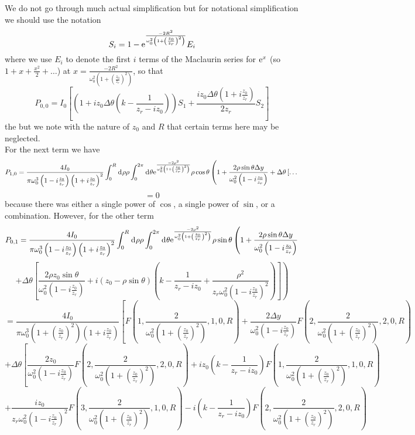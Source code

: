 \documentclass[11pt]{amsart}
\makeatletter
\newcommand{\e}{{\rm e}}				%
\newcommand{\msp}[1]{\mspace{#1mu}}		%
\newcommand{\0}{\varnothing}		%
\newcommand{\dd}{\msp{1} {\rm{d}} \msp{1}}	%
\newcommand{\1}{!}
\newcommand{\2}{@}
\newcommand{\3}{\#}
\newcommand{\4}{\$}
\newcommand{\5}{\%}
\newcommand{\6}{$^\wedge$}
\newcommand{\7}{\&}
\newcommand{\8}{*}
\newcommand{\9}{(}
\makeatother
\begin{document}
We do not go through much actual simplification but for notational simplification we should use  the notation
\[
S_i = 1- \e^{\frac{-2R^2}{\omega_0^2\left(1+\left(\frac{z_0}{z_r}\right)^2\right)}}E_i
\]
where we use $E_i$ to denote the first $i$ terms of the Maclaurin series for $\e^x$ (so $1+x+\frac{x^2}{2} + \ldots$) at $x = \frac{-2R^2}{\omega_0^2\left(1+\left(\frac{z_0}{z_r}\right)^2\right)}$, so that
\[
P_{0,0} = I_0\left[\left(1+iz_0\Delta \theta\left(k-\frac{1}{z_r-iz_0}\right)\right)S_1 + \frac{iz_0\Delta \theta\left(1+i\frac{z_0}{z_r}\right)}{2z_r}S_2\right]
\]
the but we note with the nature of $z_0$ and $R$ that certain terms here may be neglected.
\\
For the next term we have
\[
P_{1,0} = \frac{4I_0}{\pi\omega_0^3\left(1-i\frac{z_0}{z_r}\right)\left(1+i\frac{z_0}{z_r}\right)^2}\int_0^R\dd \rho \rho \int_0^{2\pi}\dd \theta \e^{\frac{-2\rho^2}{\omega_0^2\left(1+\left(\frac{z_0}{z_r}\right)^2\right)}}\rho\cos\theta\left(1+\frac{2\rho\sin\theta \Delta y}{\omega_0^2\left(1-i\frac{z_0}{z_r}\right)} + \Delta \theta\left[\ldots\right.\right.
\]
\[
=0
\]
because there was either a single power of $\cos$, a single power of $\sin$, or a combination. However, for the other term
\[
P_{0,1} =  \frac{4I_0}{\pi\omega_0^3\left(1-i\frac{z_0}{z_r}\right)\left(1+i\frac{z_0}{z_r}\right)^2}\int_0^R\dd \rho \rho \int_0^{2\pi}\dd \theta \e^{\frac{-2\rho^2}{\omega_0^2\left(1+\left(\frac{z_0}{z_r}\right)^2\right)}}\rho\sin\theta\left(1+\frac{2\rho\sin\theta \Delta y}{\omega_0^2\left(1-i\frac{z_0}{z_r}\right)} \right.\]
\[
\left.+ \Delta \theta\left[\frac{2\rho z_0 \sin \theta}{\omega_0^2\left(1-i\frac{z_0}{z_r}\right)}+i\left(z_0-\rho\sin\theta\right)\left(k-\frac{1}{z_r-iz_0}+\frac{\rho^2}{z_r\omega_0^2\left(1-i\frac{z_0}{z_r}\right)^2}\right)\right]\right)
\]
\[
=\frac{4I_0}{\pi\omega_0^3\left(1+\left(\frac{z_0}{z_r}\right)^2\right)\left(1+i\frac{z_0}{z_r}\right)}\left[F(1, \frac{2}{\omega_0^2\left(1+\left(\frac{z_0}{z_r}\right)^2\right)},1,0,R) + \frac{2\Delta y}{\omega_0^2\left(1-i\frac{z_0}{z_r}\right)}F\left(2,\frac{2}{\omega_0^2\left(1+\left(\frac{z_0}{z_r}\right)^2\right)},2,0,R\right)\right.
\]
\[\left. + \Delta \theta \left[\frac{2z_0}{\omega_0^2\left(1-i\frac{z_0}{z_r}\right)}F\left(2,\frac{2}{\omega_0^2\left(1+\left(\frac{z_0}{z_r}\right)^2\right)},2,0,R\right)+iz_0\left(k-\frac{1}{z_r-iz_0}\right)F\left(1,\frac{2}{\omega_0^2\left(1+\left(\frac{z_0}{z_r}\right)^2\right)},1,0,R\right) \right.\right.\]\[\left.\left.+ \frac{iz_0}{z_r\omega_0^2\left(1-i\frac{z_0}{z_r}\right)^2}F\left(3,\frac{2}{\omega_0^2\left(1+\left(\frac{z_0}{z_r}\right)^2\right)},1,0,R\right) -i\left(k-\frac{1}{z_r-iz_0}\right)F\left(2,\frac{2}{\omega_0^2\left(1+\left(\frac{z_0}{z_r}\right)^2\right)},2,0,R\right)\right.\right.\]
\end{document}

